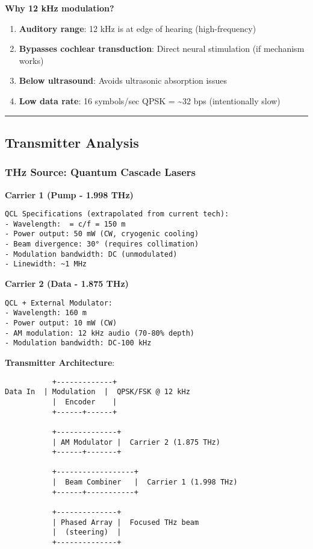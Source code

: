 \textbf{Why 12 kHz modulation?}

\begin{enumerate}
\def\labelenumi{\arabic{enumi}.}
\tightlist
\item
  \textbf{Auditory range}: 12 kHz is at edge of hearing (high-frequency)
\item
  \textbf{Bypasses cochlear transduction}: Direct neural stimulation (if
  mechanism works)
\item
  \textbf{Below ultrasound}: Avoids ultrasonic absorption issues
\item
  \textbf{Low data rate}: 16 symbols/sec QPSK = \textasciitilde32 bps
  (intentionally slow)
\end{enumerate}

\begin{center}\rule{0.5\linewidth}{0.5pt}\end{center}

\subsection{Transmitter Analysis}\label{transmitter-analysis}

\subsubsection{THz Source: Quantum Cascade
Lasers}\label{thz-source-quantum-cascade-lasers}

\textbf{Carrier 1 (Pump - 1.998 THz)}

\begin{verbatim}
QCL Specifications (extrapolated from current tech):
- Wavelength:  = c/f = 150 m
- Power output: 50 mW (CW, cryogenic cooling)
- Beam divergence: 30° (requires collimation)
- Modulation bandwidth: DC (unmodulated)
- Linewidth: ~1 MHz
\end{verbatim}

\textbf{Carrier 2 (Data - 1.875 THz)}

\begin{verbatim}
QCL + External Modulator:
- Wavelength: 160 m
- Power output: 10 mW (CW)
- AM modulation: 12 kHz audio (70-80% depth)
- Modulation bandwidth: DC-100 kHz
\end{verbatim}

\textbf{Transmitter Architecture}:

\begin{verbatim}
           +-------------+
Data In  | Modulation  |  QPSK/FSK @ 12 kHz
           |  Encoder    |
           +------+------+
                  
           +--------------+
           | AM Modulator |  Carrier 2 (1.875 THz)
           +------+-------+
                  
           +------------------+
           |  Beam Combiner   |  Carrier 1 (1.998 THz)
           +------+-----------+
                  
           +--------------+
           | Phased Array |  Focused THz beam
           |  (steering)  |
           +--------------+
\end{verbatim}

